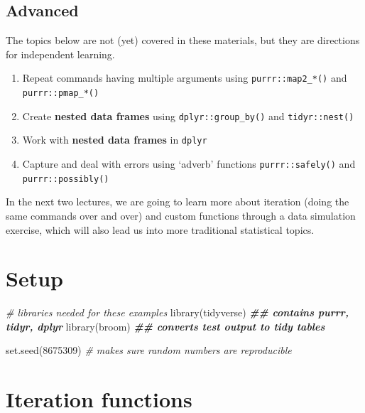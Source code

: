 \documentclass[
  oneside]{book}
\newenvironment{Shaded}{\begin{snugshade}}{\end{snugshade}}
\newcommand{\CommentTok}[1]{\textcolor[rgb]{0.56,0.35,0.01}{\textit{#1}}}
\newcommand{\DecValTok}[1]{\textcolor[rgb]{0.00,0.00,0.81}{#1}}
\newcommand{\DocumentationTok}[1]{\textcolor[rgb]{0.56,0.35,0.01}{\textbf{\textit{#1}}}}
\newcommand{\FunctionTok}[1]{\textcolor[rgb]{0.00,0.00,0.00}{#1}}
\newcommand{\NormalTok}[1]{#1}
\providecommand{\tightlist}{%
  \setlength{\itemsep}{0pt}\setlength{\parskip}{0pt}}
\begin{document}
\hypertarget{advanced}{%
\subsection*{Advanced}\label{advanced}}

The topics below are not (yet) covered in these materials, but they are directions for independent learning.

\begin{enumerate}
\def\labelenumi{\arabic{enumi}.}
\setcounter{enumi}{6}
\tightlist
\item
  Repeat commands having multiple arguments using \texttt{purrr::map2\_*()} and \texttt{purrr::pmap\_*()}
\item
  Create \textbf{nested data frames} using \texttt{dplyr::group\_by()} and \texttt{tidyr::nest()}
\item
  Work with \textbf{nested data frames} in \texttt{dplyr}
\item
  Capture and deal with errors using `adverb' functions \texttt{purrr::safely()} and \texttt{purrr::possibly()}
\end{enumerate}

In the next two lectures, we are going to learn more about iteration (doing the same commands over and over) and custom functions through a data simulation exercise, which will also lead us into more traditional statistical topics.

\hypertarget{setup-func}{%
\section{Setup}\label{setup-func}}

\begin{Shaded}
\begin{Highlighting}[]
\CommentTok{\# libraries needed for these examples}
\FunctionTok{library}\NormalTok{(tidyverse)  }\DocumentationTok{\#\# contains purrr, tidyr, dplyr}
\FunctionTok{library}\NormalTok{(broom) }\DocumentationTok{\#\# converts test output to tidy tables}

\FunctionTok{set.seed}\NormalTok{(}\DecValTok{8675309}\NormalTok{) }\CommentTok{\# makes sure random numbers are reproducible}
\end{Highlighting}
\end{Shaded}

\hypertarget{iteration-functions}{%
\section{Iteration functions}\label{iteration-functions}}
\end{document}
